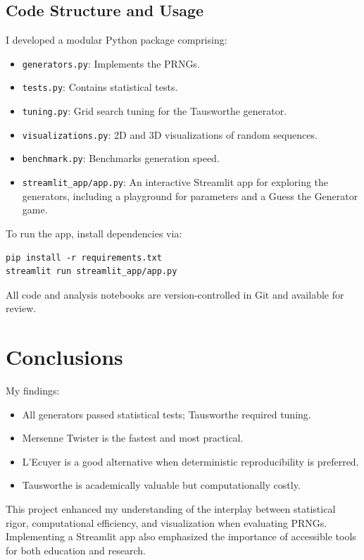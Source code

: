 \documentclass[twocolumn,12pt]{article}
\begin{document}
\subsection{Code Structure and Usage}
I developed a modular Python package comprising:
\begin{itemize}
    \item \texttt{generators.py}: Implements the PRNGs.
    \item \texttt{tests.py}: Contains statistical tests.
    \item \texttt{tuning.py}: Grid search tuning for the Tausworthe generator.
    \item \texttt{visualizations.py}: 2D and 3D visualizations of random sequences.
    \item \texttt{benchmark.py}: Benchmarks generation speed.
    \item \texttt{streamlit\_app/app.py}: An interactive Streamlit app for exploring the generators, including a playground for parameters and a Guess the Generator game.
\end{itemize}

To run the app, install dependencies via:
\begin{verbatim}
pip install -r requirements.txt
streamlit run streamlit_app/app.py
\end{verbatim}

All code and analysis notebooks are version-controlled in Git and available for review.

\section{Conclusions}
My findings:
\begin{itemize}
    \item All generators passed statistical tests; Tausworthe required tuning.
    \item Mersenne Twister is the fastest and most practical.
    \item L’Ecuyer is a good alternative when deterministic reproducibility is preferred.
    \item Tausworthe is academically valuable but computationally costly.
\end{itemize}

This project enhanced my understanding of the interplay between statistical rigor, computational efficiency, and visualization when evaluating PRNGs. Implementing a Streamlit app also emphasized the importance of accessible tools for both education and research.
\end{document}
